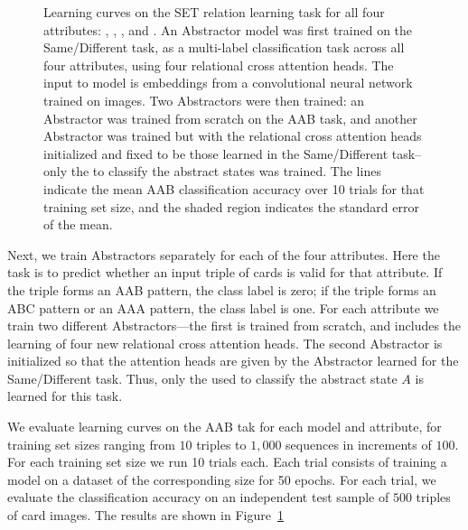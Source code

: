 \begin{figure}[t!]
\begin{center}
\begin{tabular}{cc}
	\end{tabular}
	\caption{Learning curves on the SET relation learning task for all four attributes: , , , and .  An Abstractor model was first trained on the Same/Different task, as a multi-label classification task across all four attributes, using four relational cross attention heads. The input to model is embeddings from a convolutional neural network trained on images. Two Abstractors were then trained: an Abstractor was trained from scratch on the AAB task, and another Abstractor was trained but with the relational cross attention heads initialized and fixed to be those learned in the Same/Different task--only the \MLP to classify the abstract states was trained. The lines indicate the mean AAB classification accuracy over 10 trials for that training set size, and the shaded region indicates the standard error of the mean.}
	\label{fig:aab_learning_curves}
    \end{center}
\end{figure}

 Next, we train Abstractors separately for each of the four attributes. 
Here the task is to predict whether an input triple of cards is valid for that attribute. 
If the triple forms an AAB pattern, the class label is zero; if the triple forms an ABC 
pattern or an AAA pattern, the class label is one. For each attribute we train 
two different Abstractors---the first is trained from scratch, and includes the learning 
of four new relational cross attention heads. The second Abstractor is 
initialized so that the attention heads are given by the Abstractor learned for the 
Same/Different task. Thus, only the \MLP{} used to classify the abstract state $A$ is 
learned for this task.

 We evaluate learning curves on the AAB tak for each 
model and attribute, for training set sizes ranging from $10$ triples to $1,000$ sequences in increments of $100$. For each training set size we run 10 trials each. Each trial consists of training a model on a dataset of the corresponding size for 50 epochs. For each trial, we evaluate the classification 
accuracy on an independent test sample of $500$ triples of card images. The results are shown 
in Figure~\ref{fig:aab_learning_curves}

